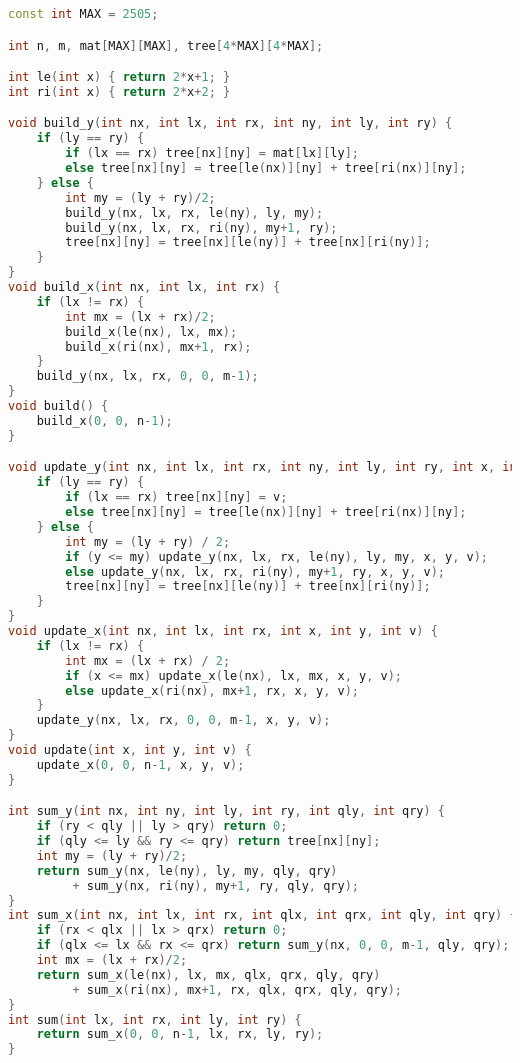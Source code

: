 \documentclass[11pt, a4paper, twoside]{article}
\begin{document}
\begin{lstlisting}[language=C++]
const int MAX = 2505;

int n, m, mat[MAX][MAX], tree[4*MAX][4*MAX];

int le(int x) { return 2*x+1; }
int ri(int x) { return 2*x+2; }

void build_y(int nx, int lx, int rx, int ny, int ly, int ry) {
    if (ly == ry) {
        if (lx == rx) tree[nx][ny] = mat[lx][ly];
        else tree[nx][ny] = tree[le(nx)][ny] + tree[ri(nx)][ny];
    } else {
        int my = (ly + ry)/2;
        build_y(nx, lx, rx, le(ny), ly, my);
        build_y(nx, lx, rx, ri(ny), my+1, ry);
        tree[nx][ny] = tree[nx][le(ny)] + tree[nx][ri(ny)];
    }
}
void build_x(int nx, int lx, int rx) {
    if (lx != rx) {
        int mx = (lx + rx)/2;
        build_x(le(nx), lx, mx);
        build_x(ri(nx), mx+1, rx);
    }
    build_y(nx, lx, rx, 0, 0, m-1);
}
void build() {
    build_x(0, 0, n-1);
}

void update_y(int nx, int lx, int rx, int ny, int ly, int ry, int x, int y, int v) {
    if (ly == ry) {
        if (lx == rx) tree[nx][ny] = v;
        else tree[nx][ny] = tree[le(nx)][ny] + tree[ri(nx)][ny];
    } else {
        int my = (ly + ry) / 2;
        if (y <= my) update_y(nx, lx, rx, le(ny), ly, my, x, y, v);
        else update_y(nx, lx, rx, ri(ny), my+1, ry, x, y, v);
        tree[nx][ny] = tree[nx][le(ny)] + tree[nx][ri(ny)];
    }
}
void update_x(int nx, int lx, int rx, int x, int y, int v) {
    if (lx != rx) {
        int mx = (lx + rx) / 2;
        if (x <= mx) update_x(le(nx), lx, mx, x, y, v);
        else update_x(ri(nx), mx+1, rx, x, y, v);
    }
    update_y(nx, lx, rx, 0, 0, m-1, x, y, v);
}
void update(int x, int y, int v) {
    update_x(0, 0, n-1, x, y, v);
}

int sum_y(int nx, int ny, int ly, int ry, int qly, int qry) {
    if (ry < qly || ly > qry) return 0;
    if (qly <= ly && ry <= qry) return tree[nx][ny];
    int my = (ly + ry)/2;
    return sum_y(nx, le(ny), ly, my, qly, qry)
         + sum_y(nx, ri(ny), my+1, ry, qly, qry);
}
int sum_x(int nx, int lx, int rx, int qlx, int qrx, int qly, int qry) {
    if (rx < qlx || lx > qrx) return 0;
    if (qlx <= lx && rx <= qrx) return sum_y(nx, 0, 0, m-1, qly, qry);
    int mx = (lx + rx)/2;
    return sum_x(le(nx), lx, mx, qlx, qrx, qly, qry)
         + sum_x(ri(nx), mx+1, rx, qlx, qrx, qly, qry);
}
int sum(int lx, int rx, int ly, int ry) {
    return sum_x(0, 0, n-1, lx, rx, ly, ry);
}
\end{lstlisting}
\end{document}
